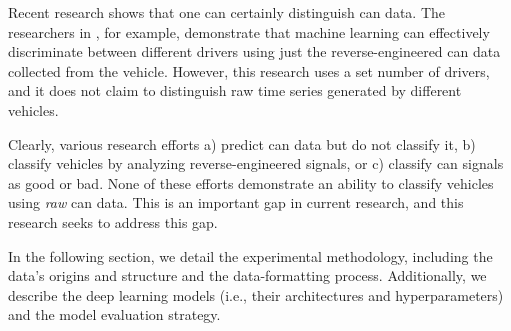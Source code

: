 \documentclass[../main.tex]{subfiles}
\begin{document}
Recent research shows that one can certainly distinguish \ac{can} data. The researchers in \cite{Enev2016}, for example, demonstrate that machine learning can effectively discriminate between different drivers using just the reverse-engineered \ac{can} data collected from the vehicle. However, this research uses a set number of drivers, and it does not claim to distinguish raw time series generated by different vehicles.


Clearly, various research efforts a) predict \ac{can} data but do not classify it, b) classify vehicles by analyzing reverse-engineered signals, or c) classify \ac{can} signals as good or bad. None of these efforts demonstrate an ability to classify vehicles using \textit{raw} \ac{can} data. This is an important gap in current research, and this research seeks to address this gap.

In the following section, we detail the experimental methodology, including the data's origins and structure and the data-formatting process. Additionally, we describe the deep learning models (i.e., their architectures and hyperparameters) and the model evaluation strategy.
\end{document}
